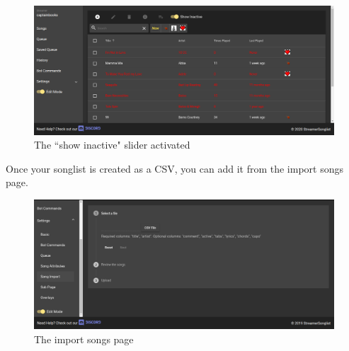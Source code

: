 \begin{figure}[ht!]
  \includegraphics[width=\linewidth]{src/songlist_import/inactive_songs_displayed.png}
  \caption{The ``show inactive" slider activated}
  \label{acitve show inactive}
\end{figure}

\clearpage

Once your songlist is created as a CSV, you can add it from the import songs page.

\begin{figure}[ht!]
  \includegraphics[width=\linewidth]{src/songlist_import/import_songs.png}
  \caption{The import songs page}
  \label{import songs}
\end{figure}
